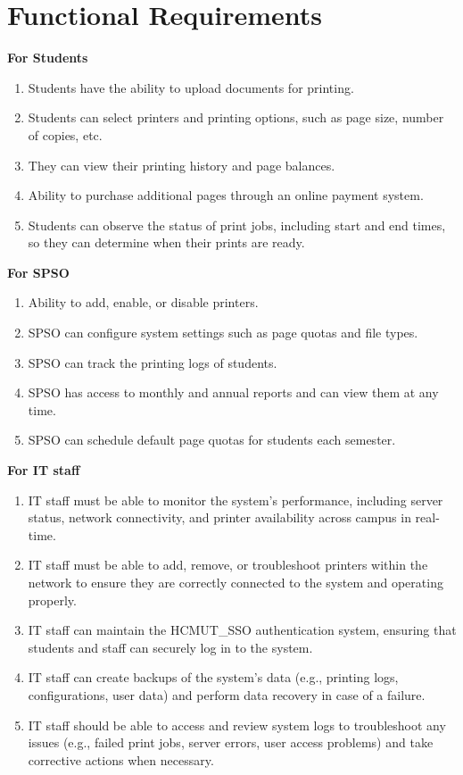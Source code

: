 \section{Functional Requirements}
\textbf{For Students}
\begin{enumerate}
    \item Students have the ability to upload documents for printing.
    \item Students can select printers and printing options, such as page size, number of copies, etc.
    \item They can view their printing history and page balances.
    \item Ability to purchase additional pages through an online payment system.
    \item Students can observe the status of print jobs, including start and end times, so they can determine when their prints are ready.
\end{enumerate}
\textbf{For SPSO}
\begin{enumerate}
    \item Ability to add, enable, or disable printers.
    \item SPSO can configure system settings such as page quotas and file types.
    \item SPSO can track the printing logs of students.
    \item SPSO has access to monthly and annual reports and can view them at any time.
    \item SPSO can schedule default page quotas for students each semester.
\end{enumerate}
\textbf{For IT staff}
\begin{enumerate}
    \item IT staff must be able to monitor the system’s performance, including server status, network connectivity, and printer availability across campus in real-time.
    \item IT staff must be able to add, remove, or troubleshoot printers within the network to ensure they are correctly connected to the system and operating properly.
    \item IT staff can maintain the HCMUT\_SSO authentication system, ensuring that students and staff can securely log in to the system.
    \item IT staff can create backups of the system's data (e.g., printing logs, configurations, user data) and perform data recovery in case of a failure.
    \item IT staff should be able to access and review system logs to troubleshoot any issues (e.g., failed print jobs, server errors, user access problems) and take corrective actions when necessary.
\end{enumerate}
